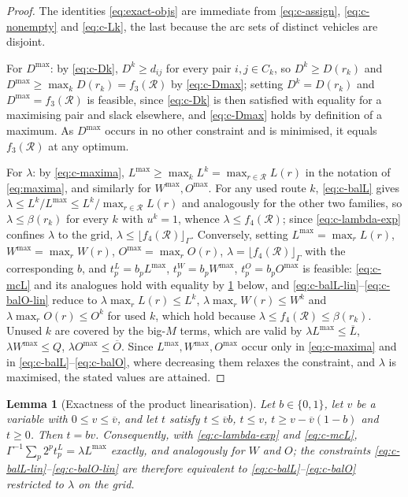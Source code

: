 \documentclass[11pt,a4paper]{article}
\theoremstyle{definition}
\theoremstyle{plain}
\newtheorem{lemma}[definition]{Lemma}
\newcommand{\Routes}{\mathcal{R}}
\newcommand{\Lmax}{L^{\max}}
\newcommand{\Wmax}{W^{\max}}
\newcommand{\Omax}{O^{\max}}
\newcommand{\Dmax}{D^{\max}}
\newcommand{\Lub}{\overline{L}}
\newcommand{\Oub}{\overline{O}}
\begin{document}
\begin{proof}
The identities \eqref{eq:exact-objs} are immediate from
\eqref{eq:c-assign}, \eqref{eq:c-nonempty} and \eqref{eq:c-Lk}, the last
because the arc sets of distinct vehicles are disjoint.

For $\Dmax$: by \eqref{eq:c-Dk}, $D^k \ge d_{ij}$ for every pair
$i,j \in C_k$, so $D^k \ge D(r_k)$ and $\Dmax \ge \max_k D(r_k) = f_3(\Routes)$
by \eqref{eq:c-Dmax}; setting $D^k = D(r_k)$ and $\Dmax = f_3(\Routes)$ is
feasible, since \eqref{eq:c-Dk} is then satisfied with equality for a maximising
pair and slack elsewhere, and \eqref{eq:c-Dmax} holds by definition of a
maximum.  As $\Dmax$ occurs in no other constraint and is minimised, it equals
$f_3(\Routes)$ at any optimum.

For $\lambda$: by \eqref{eq:c-maxima}, $\Lmax \ge \max_k L^k = \max_{r \in \Routes} L(r)$ in the
notation of \eqref{eq:maxima}, and similarly for $\Wmax, \Omax$.  For any used
route $k$, \eqref{eq:c-balL} gives
$\lambda \le L^k/\Lmax \le L^k/\max_{r\in\Routes} L(r)$ and analogously for the other two
families, so $\lambda \le \beta(r_k)$ for every $k$ with $u^k = 1$, whence
$\lambda \le f_4(\Routes)$; since \eqref{eq:c-lambda-exp} confines $\lambda$ to
the grid, $\lambda \le \lfloor f_4(\Routes) \rfloor_\Gamma$.  Conversely,
setting $\Lmax = \max_{r} L(r)$, $\Wmax = \max_{r} W(r)$, $\Omax = \max_{r} O(r)$,
$\lambda = \lfloor f_4(\Routes) \rfloor_\Gamma$ with the corresponding
$b$, and $t^L_p = b_p \Lmax$, $t^W_p = b_p \Wmax$, $t^O_p = b_p \Omax$ is
feasible: \eqref{eq:c-mcL} and its analogues hold with equality by
\cref{lem:mccormick} below, and
\eqref{eq:c-balL-lin}--\eqref{eq:c-balO-lin} reduce to
$\lambda \max_r L(r) \le L^k$, $\lambda \max_r W(r) \le W^k$ and
$\lambda \max_r O(r) \le O^k$ for used $k$, which hold because
$\lambda \le f_4(\Routes) \le \beta(r_k)$.  Unused $k$ are covered by the
big-$M$ terms, which are valid by
$\lambda \Lmax \le \Lub$, $\lambda \Wmax \le Q$, $\lambda \Omax \le \Oub$.
Since $\Lmax, \Wmax, \Omax$ occur only in \eqref{eq:c-maxima} and in
\eqref{eq:c-balL}--\eqref{eq:c-balO}, where decreasing them relaxes the
constraint, and $\lambda$ is maximised, the stated values are attained.
\end{proof}

\begin{lemma}[Exactness of the product linearisation]
\label{lem:mccormick}
Let $b \in \{0,1\}$, let $v$ be a variable with $0 \le v \le \overline{v}$, and
let $t$ satisfy $t \le \overline{v} b$, $t \le v$,
$t \ge v - \overline{v}(1-b)$ and $t \ge 0$.  Then $t = bv$.  Consequently, with
\eqref{eq:c-lambda-exp} and \eqref{eq:c-mcL},
$\Gamma^{-1}\sum_{p} 2^{p} t^{L}_p = \lambda \Lmax$ exactly, and analogously
for $W$ and $O$; the constraints
\eqref{eq:c-balL-lin}--\eqref{eq:c-balO-lin} are therefore equivalent to
\eqref{eq:c-balL}--\eqref{eq:c-balO} restricted to $\lambda$ on the grid.
\end{lemma}
\end{document}
